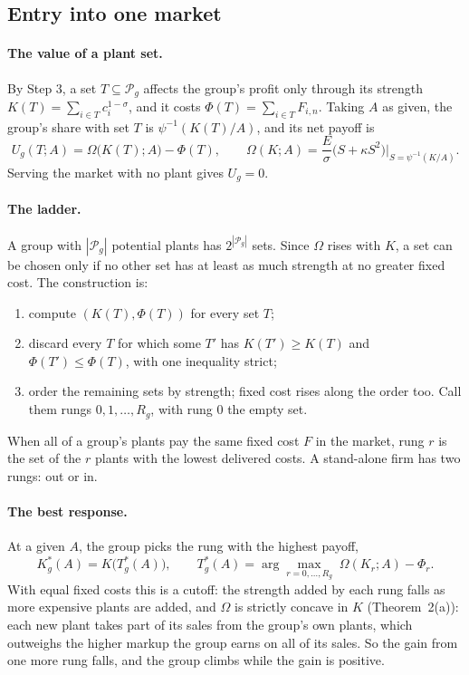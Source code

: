 \documentclass[11pt]{article}
\newcommand{\cP}{\mathcal P}
\begin{document}
\subsection{Entry into one market}

\paragraph{The value of a plant set.} By Step 3, a set $T\subseteq\cP_g$ affects the
group's profit only through its strength $K(T)=\sum_{i\in T}c_i^{1-\sigma}$, and it
costs $\Phi(T)=\sum_{i\in T}F_{i,n}$. Taking $A$ as given, the group's share with set $T$
is $\psi^{-1}(K(T)/A)$, and its net payoff is
\begin{equation}
  U_g(T;A)=\Omega\bigl(K(T);A\bigr)-\Phi(T),
  \qquad
  \Omega(K;A)=\frac{E}{\sigma}\bigl(S+\kappa S^2\bigr)\Big|_{S=\psi^{-1}(K/A)} .
  \label{eq:payoff}
\end{equation}
Serving the market with no plant gives $U_g=0$.

\paragraph{The ladder.} A group with $|\cP_g|$ potential plants has $2^{|\cP_g|}$ sets.
Since $\Omega$ rises with $K$, a set can be chosen only if no other set has at least as
much strength at no greater fixed cost. The construction is:
\begin{enumerate}
\item compute $(K(T),\Phi(T))$ for every set $T$;
\item discard every $T$ for which some $T'$ has $K(T')\ge K(T)$ and
$\Phi(T')\le\Phi(T)$, with one inequality strict;
\item order the remaining sets by strength; fixed cost rises along the order too. Call
them rungs $0,1,\dots,R_g$, with rung 0 the empty set.
\end{enumerate}
When all of a group's plants pay the same fixed cost $F$ in the market, rung $r$ is the
set of the $r$ plants with the lowest delivered costs. A stand-alone firm has two rungs:
out or in.

\paragraph{The best response.} At a given $A$, the group picks the rung with the highest
payoff,
\begin{equation}
  K^*_g(A)=K\bigl(T^*_g(A)\bigr),
  \qquad
  T^*_g(A)=\arg\max_{r=0,\dots,R_g}\;\Omega(K_r;A)-\Phi_r .
  \label{eq:bestresponse}
\end{equation}
With equal fixed costs this is a cutoff: the strength added by each rung falls as more
expensive plants are added, and $\Omega$ is strictly concave in $K$ (Theorem~2(a)): each
new plant takes part of its sales from the group's own plants, which outweighs the
higher markup the group earns on all of its sales. So the gain from one more rung falls,
and the group climbs while the gain is positive.
\end{document}
